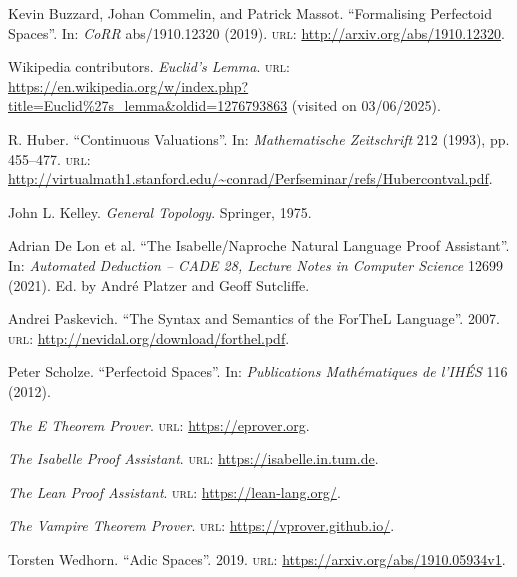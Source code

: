 \documentclass[11pt]{article}
\begin{document}
\begin{thebibliography}{99}
   Kevin Buzzard, Johan Commelin, and Patrick Massot.
   ``Formalising Perfectoid Spaces''.
   In: \textit{CoRR} abs/1910.12320 (2019).
   \textsc{url}: \url{http://arxiv.org/abs/1910.12320}.

   Wikipedia contributors.
   \textit{Euclid's Lemma}.
   \textsc{url}: \url{https://en.wikipedia.org/w/index.php?title=Euclid%27s_lemma&oldid=1276793863}
   (visited on 03/06/2025).
   
   R. Huber.
   ``Continuous Valuations''.
   In: \textit{Mathematische Zeitschrift} 212 (1993),
   pp. 455--477.
   \textsc{url}: \url{http://virtualmath1.stanford.edu/~conrad/Perfseminar/refs/Hubercontval.pdf}.
   
   John L. Kelley.
   \textit{General Topology}.
   Springer, 1975.
   
   Adrian De Lon et al.
   ``The Isabelle/Naproche Natural Language Proof Assistant''.
   In: \textit{Automated Deduction -- CADE 28, Lecture Notes in Computer Science} 12699 (2021).
   Ed. by André Platzer and Geoff Sutcliffe.
   
   Andrei Paskevich.
   ``The Syntax and Semantics of the ForTheL Language''.
   2007.
   \textsc{url}: \url{http://nevidal.org/download/forthel.pdf}.
   
   Peter Scholze.
   ``Perfectoid Spaces''.
   In: \textit{Publications Mathématiques de l'IHÉS} 116 (2012).
   
   \textit{The E Theorem Prover}.
   \textsc{url}: \url{https://eprover.org}.
   
   \textit{The Isabelle Proof Assistant}.
   \textsc{url}: \url{https://isabelle.in.tum.de}.
   
   \textit{The Lean Proof Assistant}.
   \textsc{url}: \url{https://lean-lang.org/}.
   
   \textit{The Vampire Theorem Prover}.
   \textsc{url}: \url{https://vprover.github.io/}.
   
   Torsten Wedhorn.
   ``Adic Spaces''.
   2019.
   \textsc{url}: \url{https://arxiv.org/abs/1910.05934v1}.
\end{thebibliography}
\end{document}
